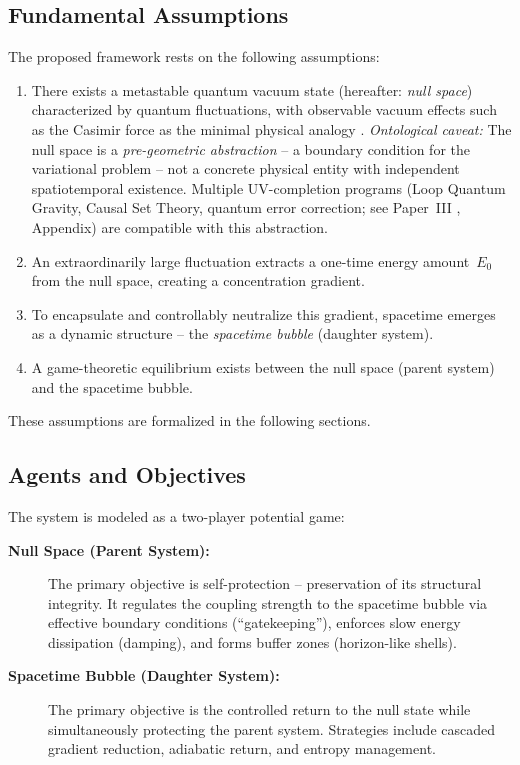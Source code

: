 \documentclass[aps,prd,twocolumn,superscriptaddress,nofootinbib]{revtex4-2}
\begin{document}
\subsection{Fundamental Assumptions}
\label{subsec:assumptions}

The proposed framework rests on the following assumptions:

\begin{enumerate}
\item There exists a metastable quantum vacuum state (hereafter: \textit{null space}) characterized by quantum fluctuations, with observable vacuum effects such as the Casimir force as the minimal physical analogy \cite{Casimir1948}. \textit{Ontological caveat:} The null space is a \emph{pre-geometric abstraction} -- a boundary condition for the variational problem -- not a concrete physical entity with independent spatiotemporal existence. Multiple UV-completion programs (Loop Quantum Gravity, Causal Set Theory, quantum error correction; see Paper~III \cite{Geiger2026c}, Appendix) are compatible with this abstraction.
\item An extraordinarily large fluctuation extracts a one-time energy amount~$E_0$ from the null space, creating a concentration gradient.
\item To encapsulate and controllably neutralize this gradient, spacetime emerges as a dynamic structure -- the \textit{spacetime bubble} (daughter system).
\item A game-theoretic equilibrium exists between the null space (parent system) and the spacetime bubble.
\end{enumerate}

These assumptions are formalized in the following sections.

\subsection{Agents and Objectives}
\label{subsec:agents}

The system is modeled as a two-player potential game:

\begin{description}
\item[\textbf{Null Space (Parent System):}] The primary objective is self-protection -- preservation of its structural integrity. It regulates the coupling strength to the spacetime bubble via effective boundary conditions (``gatekeeping''), enforces slow energy dissipation (damping), and forms buffer zones (horizon-like shells).
\item[\textbf{Spacetime Bubble (Daughter System):}] The primary objective is the controlled return to the null state while simultaneously protecting the parent system. Strategies include cascaded gradient reduction, adiabatic return, and entropy management.
\end{description}
\end{document}
